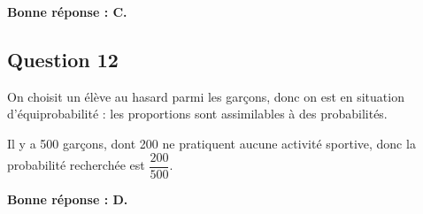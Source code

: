 \documentclass[10pt]{article}
\begin{document}
	\textbf{Bonne réponse : C.}

\subsection*{Question 12}
	On choisit un élève au hasard parmi les garçons, donc on est en situation d'équiprobabilité : les proportions sont assimilables à des probabilités.

	Il y a 500 garçons, dont 200 ne pratiquent aucune activité sportive, donc la probabilité recherchée est \mbox{$\dfrac{200}{500}$}.

	\textbf{Bonne réponse : D.}
\end{document}
